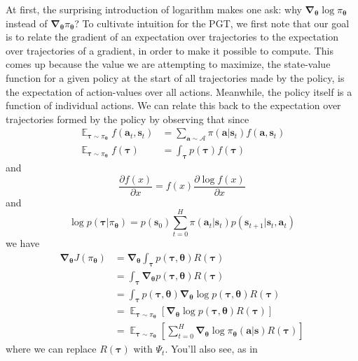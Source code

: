 \documentclass{article}
\begin{document}
At first, the surprising introduction of logarithm makes one ask: why $\boldsymbol{\nabla}_{\boldsymbol{\theta}}\log\pi_{\boldsymbol{\theta}}$ instead of $\boldsymbol{\nabla}_{\boldsymbol{\theta}}\pi_{\boldsymbol{\theta}}$? To cultivate intuition for the PGT, we first note that our goal is to relate the gradient of an expectation over trajectories to the expectation over trajectories of a gradient, in order to make it possible to compute. This comes up because the value we are attempting to maximize, the state-value function for a given policy at the start of all trajectories made by the policy, is the expectation of action-values over all actions. Meanwhile, the policy itself is a function of individual actions. We can relate this back to the expectation over trajectories formed by the policy by observing that since \begin{equation}\begin{split}\mathop{\mathbb{E}}_{\boldsymbol{\tau}\sim\pi_{\boldsymbol{\theta}}}f(\mathbf{a}_t,\mathbf{s}_t)&=\sum_{\mathbf{a}\sim\mathcal{A}}\pi(\mathbf{a}|\mathbf{s}_t)f(\mathbf{a},\mathbf{s}_t)\\\mathop{\mathbb{E}}_{\boldsymbol{\tau}\sim\pi_{\boldsymbol{\theta}}}f(\boldsymbol{\tau})&=\int_{\boldsymbol{\tau}}p(\boldsymbol{\tau})f(\boldsymbol{\tau})\end{split}\end{equation} and \begin{equation}\frac{\partial f(x)}{\partial x}=f(x)\frac{\partial \log f(x)}{\partial x}\end{equation}and \begin{equation}\log p(\boldsymbol{\tau}|\pi_{\boldsymbol{\theta}})=p(\mathbf{s}_0)\sum_{t=0}^H \pi(\mathbf{a}_t|\mathbf{s}_t)p(\mathbf{s}_{t+1}|\mathbf{s}_t,\mathbf{a}_t)\end{equation} we have \begin{equation}\begin{split}\boldsymbol{\nabla}_{\boldsymbol{\theta}}J(\pi_{\boldsymbol{\theta}})&=\boldsymbol{\nabla}_{\boldsymbol{\theta}}\int_{\boldsymbol{\tau}}p(\boldsymbol{\tau},\boldsymbol{\theta})R(\boldsymbol{\tau})\\&=\int_{\boldsymbol{\tau}}\boldsymbol{\nabla}_{\boldsymbol{\theta}}p(\boldsymbol{\tau},\boldsymbol{\theta})R(\boldsymbol{\tau})\\&=\int_{\boldsymbol{\tau}}p(\boldsymbol{\tau},\boldsymbol{\theta})\boldsymbol{\nabla}_{\boldsymbol{\theta}}\log p(\boldsymbol{\tau},\boldsymbol{\theta})R(\boldsymbol{\tau})\\&=\mathop{\mathbb{E}}_{\boldsymbol{\tau}\sim\pi_{\boldsymbol{\theta}}}\left[\boldsymbol{\nabla}_{\boldsymbol{\theta}}\log p(\boldsymbol{\tau},\boldsymbol{\theta})R(\boldsymbol{\tau})\right]\\&=\mathop{\mathbb{E}}_{\boldsymbol{\tau}\sim\pi_{\boldsymbol{\theta}}}\left[\sum_{t=0}^{H}\boldsymbol{\nabla}_{\boldsymbol{\theta}}\log \pi_{\boldsymbol{\theta}}(\mathbf{a}|\mathbf{s})R(\boldsymbol{\tau})\right]\end{split}\end{equation}where we can replace $R(\boldsymbol{\tau})$ with $\Psi_t$. You'll also see, as in 
\end{document}
